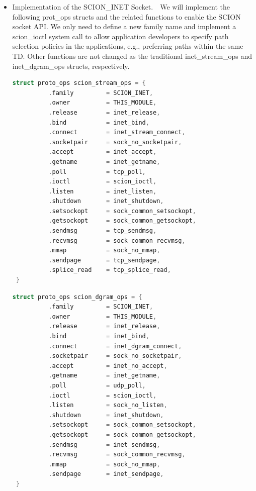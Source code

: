\begin{itemize}
\item{Implementation of the SCION\_INET Socket.}\ \ We will implement the following prot\_ops
structs and the related functions to enable the SCION socket API. We
only need to define a new family name and implement a scion\_ioctl
system call to allow application developers to specify path
selection policies in the applications, e.g., preferring paths
within the same TD. Other functions are not changed as the
traditional inet\_stream\_ops and inet\_dgram\_ops structs,
respectively.

\begin{footnotesize}
\begin{lstlisting}[language=C]
 struct proto_ops scion_stream_ops = {
          .family         = SCION_INET,
          .owner          = THIS_MODULE,
          .release        = inet_release,
          .bind           = inet_bind,
          .connect        = inet_stream_connect,
          .socketpair     = sock_no_socketpair,
          .accept         = inet_accept,
          .getname        = inet_getname,
          .poll           = tcp_poll,
          .ioctl          = scion_ioctl,
          .listen         = inet_listen,
          .shutdown       = inet_shutdown,
          .setsockopt     = sock_common_setsockopt,
          .getsockopt     = sock_common_getsockopt,
          .sendmsg        = tcp_sendmsg,
          .recvmsg        = sock_common_recvmsg,
          .mmap           = sock_no_mmap,
          .sendpage       = tcp_sendpage,
          .splice_read    = tcp_splice_read,
 }
\end{lstlisting}

\begin{lstlisting}[language=C]
 struct proto_ops scion_dgram_ops = {
          .family         = SCION_INET,
          .owner          = THIS_MODULE,
          .release        = inet_release,
          .bind           = inet_bind,
          .connect        = inet_dgram_connect,
          .socketpair     = sock_no_socketpair,
          .accept         = inet_no_accept,
          .getname        = inet_getname,
          .poll           = udp_poll,
          .ioctl          = scion_ioctl,
          .listen         = sock_no_listen,
          .shutdown       = inet_shutdown,
          .setsockopt     = sock_common_setsockopt,
          .getsockopt     = sock_common_getsockopt,
          .sendmsg        = inet_sendmsg,
          .recvmsg        = sock_common_recvmsg,
          .mmap           = sock_no_mmap,
          .sendpage       = inet_sendpage,
 }
\end{lstlisting}
\end{footnotesize}


\end{itemize}
